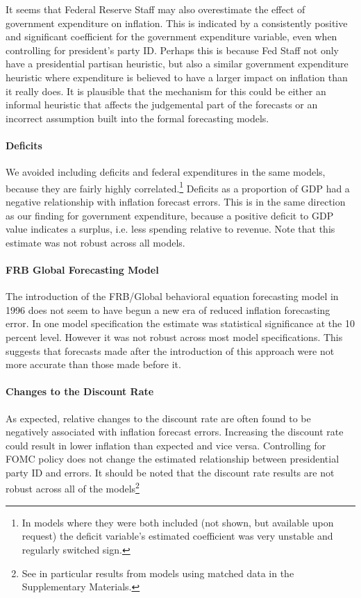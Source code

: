 \documentclass[a4paper]{article}
\begin{document}
It seems that Federal Reserve Staff may also overestimate the effect of government expenditure on inflation. This is indicated by a consistently positive and significant coefficient for the government expenditure variable, even when controlling for president's party ID. Perhaps this is because Fed Staff not only have a presidential partisan heuristic, but also a similar government expenditure heuristic where expenditure is believed to have a larger impact on inflation than it really does. It is plausible that the mechanism for this could be either an informal heuristic that affects the judgemental part of the forecasts or an incorrect assumption built into the formal forecasting models.

\paragraph{Deficits} We avoided including deficits and federal expenditures in the same models, because they are fairly highly correlated.\footnote{In models where they were both included (not shown, but available upon request) the deficit variable's estimated coefficient was very unstable and regularly switched sign.} Deficits as a proportion of GDP had a negative relationship with inflation forecast errors. This is in the same direction as our finding for government expenditure, because a positive deficit to GDP value indicates a surplus, i.e. less spending relative to revenue. Note that this estimate was not robust across all models.

\paragraph{FRB Global Forecasting Model}

The introduction of the FRB/Global behavioral equation forecasting model in 1996 does not seem to have begun a new era of reduced inflation forecasting error. In one model specification the estimate was statistical significance at the 10 percent level. However it was not robust across most model specifications. This suggests that forecasts made after the introduction of this approach were not more accurate than those made before it. 

\paragraph{Changes to the Discount Rate}

As expected, relative changes to the discount rate are often found to be negatively associated with inflation forecast errors. Increasing the discount rate could result in lower inflation than expected and vice versa. Controlling for FOMC policy does not change the estimated relationship between presidential party ID and errors. It should be noted that the discount rate results are not robust across all of the models\footnote{See in particular results from models using matched data in the Supplementary Materials.} 
\end{document}
